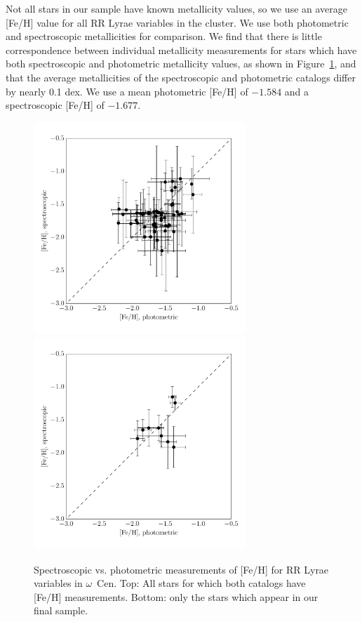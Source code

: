 \documentclass[a4paper,fleqn,usenatbib]{mnras}
\begin{document}
Not all stars in our sample have known metallicity values, so we use an average [Fe/H] value for all RR Lyrae variables in the cluster. We use both photometric \citep{2000AJ....119.1824R} and spectroscopic \citep{2006ApJ...640L..43S} metallicities for comparison. We find that there is little correspondence between individual metallicity measurements for stars which have both spectroscopic and photometric metallicity values, as shown in Figure~\ref{fig:metallicity_comparison}, and that the average metallicities of the spectroscopic and photometric catalogs differ by nearly 0.1 dex. We use a mean photometric [Fe/H] of  $-1.584$ and a spectroscopic [Fe/H] of $-1.677$.

\begin{figure}
\begin{center}
\includegraphics[width=80mm]{final_plots/metallicity_comparison_all.pdf}
\includegraphics[width=80mm]{final_plots/metallicity_comparison_samestars.pdf}
\caption{Spectroscopic vs. photometric measurements of [Fe/H] for RR Lyrae variables in $\omega$~Cen. Top: All stars for which both catalogs have [Fe/H] measurements. Bottom: only the stars which appear in our final sample.}
\label{fig:metallicity_comparison}
\end{center}
\end{figure}
\end{document}
